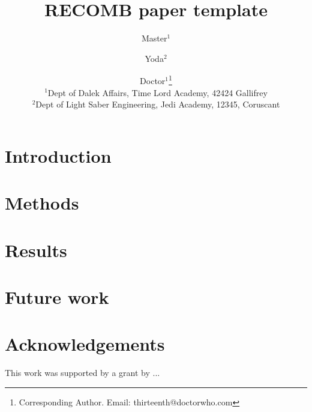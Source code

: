 \documentclass[11pt,letterpaper]{article}
\begin{document}
\thispagestyle{empty}

\title{RECOMB paper template}
\author
{
\centering
Master$^{1}$ \and Yoda$^{2}$ \and Doctor$^{1}$\footnote{Corresponding Author. Email: thirteenth@doctorwho.com} 
\\
		$^{1}$Dept of Dalek Affairs, Time Lord Academy, 42424 Gallifrey\\
	   	$^{2}$Dept of Light Saber Engineering, Jedi Academy, 12345, Coruscant\\	
}

\date{}

\maketitle
\begin{abstract}
  
\end{abstract}

\section{Introduction}
  
   
\section{Methods}
  

\section{Results}
  
\section{Future work}
  

\section{Acknowledgements} 
This work was supported by a grant by ...




\end{document}
